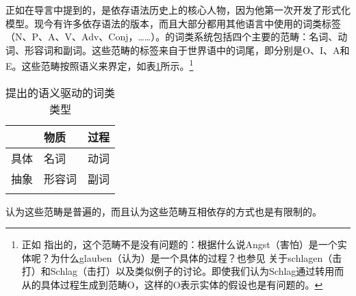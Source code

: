 正如在导言中提到的，\tes 是依存语法历史上的核心人物，因为他第一次开发了形式化模型\citep{Tesniere59a-u,Tesniere80a-u,Tesniere2015a-not-crossreferenced}。现今有许多依存语法的版本，而且大部分都用其他语言中使用的词类标签（N、P、A、V、Adv、Conj，……）。\tes 的词类系统包括四个主要的范畴：名词、动词、形容词和副词。这些范畴的标签来自于世界语中的词尾，即分别是O、I、A和E。这些范畴按照语义来界定，如表\ref{table-pos-tesniere}所示。\footnote{%
正如 \citet[]{Weber97a}指出的，这个范畴不是没有问题的：根据什么说Angst（害怕）是一个实体呢？为什么glauben（认为）是一个具体的过程？也参见 \citet[\S~3.4]{Klein71a-u}关于schlagen（击打）和Schlag（击打）以及类似例子的讨论。即使我们认为Schlag通过转用而从的具体过程生成到范畴O，这样的O表示实体的假设也是有问题的。
}
\begin{table}
\begin{tabular}{lll}
\lsptoprule
         & 物质 & 过程\\
\midrule
具体 & 名词 & 动词 \\
抽象 & 形容词 & 副词\\
\lspbottomrule
\end{tabular}
\caption{\label{table-pos-tesniere}\tes 提出的语义驱动的词类类型}
\end{table}%
\tes 认为这些范畴是普遍的，而且认为这些范畴互相依存的方式也是有限制的。


